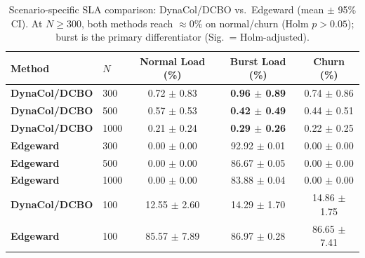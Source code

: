 \begin{table}[!t]
\centering
\caption{Scenario-specific SLA comparison: DynaCol/DCBO vs.\ Edgeward (mean $\pm$ 95\% CI). At $N\geq300$, both methods reach $\approx$0\% on normal/churn (Holm $p>0.05$); burst is the primary differentiator (Sig.\ = Holm-adjusted).}
\label{tab:edgeward_comparison}
\fgcsTablePage
\begin{tabular*}{\textwidth}{@{\extracolsep{\fill}}llccc@{}}
\toprule
\textbf{Method} & \textbf{$N$} & \textbf{Normal Load (\%)} & \textbf{Burst Load (\%)} & \textbf{Churn (\%)} \\
\midrule
\textcolor{dynacolBlue}{\textbf{DynaCol/DCBO}} & 300 & 0.72 $\pm$ 0.83 & \textbf{0.96 $\pm$ 0.89} & 0.74 $\pm$ 0.86 \\
\textcolor{dynacolBlue}{\textbf{DynaCol/DCBO}} & 500 & 0.57 $\pm$ 0.53 & \textbf{0.42 $\pm$ 0.49} & 0.44 $\pm$ 0.51 \\
\textcolor{dynacolBlue}{\textbf{DynaCol/DCBO}} & 1000 & 0.21 $\pm$ 0.24 & \textbf{0.29 $\pm$ 0.26} & 0.22 $\pm$ 0.25 \\
\textcolor{dynacolPurple}{\textbf{Edgeward}} & 300 & 0.00 $\pm$ 0.00 & 92.92 $\pm$ 0.01 & 0.00 $\pm$ 0.00 \\
\textcolor{dynacolPurple}{\textbf{Edgeward}} & 500 & 0.00 $\pm$ 0.00 & 86.67 $\pm$ 0.05 & 0.00 $\pm$ 0.00 \\
\textcolor{dynacolPurple}{\textbf{Edgeward}} & 1000 & 0.00 $\pm$ 0.00 & 83.88 $\pm$ 0.04 & 0.00 $\pm$ 0.00 \\
\midrule
\textcolor{dynacolBlue}{\textbf{DynaCol/DCBO}} & 100 & 12.55 $\pm$ 2.60 & 14.29 $\pm$ 1.70 & 14.86 $\pm$ 1.75 \\
\textcolor{dynacolPurple}{\textbf{Edgeward}} & 100 & 85.57 $\pm$ 7.89 & 86.97 $\pm$ 0.28 & 86.65 $\pm$ 7.41 \\
\bottomrule
\end{tabular*}
\end{table}